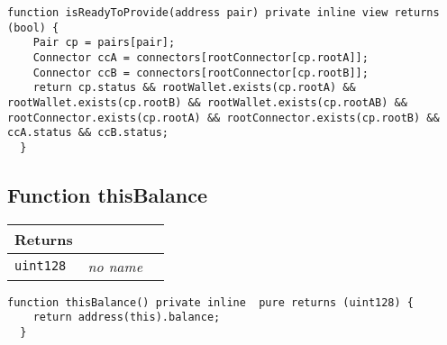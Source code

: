 \vspace{2cm}

\begin{lstlisting}[firstnumber=206]
  function isReadyToProvide(address pair) private inline view returns (bool) {
    Pair cp = pairs[pair];
    Connector ccA = connectors[rootConnector[cp.rootA]];
    Connector ccB = connectors[rootConnector[cp.rootB]];
    return cp.status && rootWallet.exists(cp.rootA) && rootWallet.exists(cp.rootB) && rootWallet.exists(cp.rootAB) && rootConnector.exists(cp.rootA) && rootConnector.exists(cp.rootB) && ccA.status && ccB.status;
  }
\end{lstlisting}

\subsection{Function thisBalance}


\ifsoltables
\noindent\begin{tabular}{|l|l|p{5cm}|}\hline
\multicolumn{3}{|l|}{\bf Returns}\\\hline
\tt uint128 & {\em no name} &\\\hline
\end{tabular}
\fi

\vspace{2cm}

\begin{lstlisting}[firstnumber=346]
  function thisBalance() private inline  pure returns (uint128) {
    return address(this).balance;
  }
\end{lstlisting}
